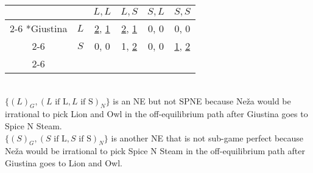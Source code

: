 \documentclass{article}
\begin{document}
\begin{question}
\begin{solution}
\begin{tasks}
\begin{tabular}{*{6}{c|}}
      \multicolumn{1}{c}{} &  & $L,L$ & $L,S$ & $S,L$ & $S,S$ \\ \cline{2-6} 
      \multirow{2}*{Giustina}
      & $L$ & \underline{2}, \underline{1} &  \underline{2}, \underline{1} & 0, 0 & 0, 0 \\ \cline{2-6}
      & $S$ & 0, 0 &  1, \underline{2} & 0, 0 & \underline{1}, \underline{2} \\ \cline{2-6} 
  \end{tabular} \\
  $\{(L)_G, (L\text{ if L}, L\text{ if S})_N\}$
  is an NE but not SPNE
  because Ne\v{z}a would be irrational to pick Lion and Owl
  in the off-equilibrium path after Giustina goes to Spice N Steam. \\
  $\{(S)_G, (S\text{ if L}, S\text{ if S})_N\}$
  is another NE that is not sub-game perfect
  because Ne\v{z}a would be irrational to pick Spice N Steam
  in the off-equilibrium path after Giustina goes to Lion and Owl. \\
  \end{tasks}
\end{solution}
\end{question}

\newpage
\end{document}
